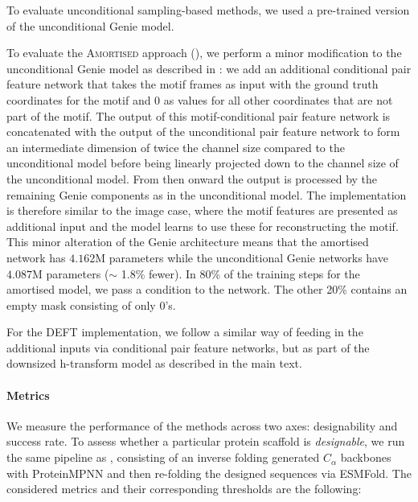 To evaluate unconditional sampling-based methods, we used a pre-trained version of the unconditional Genie model.

To evaluate the {\scshape Amortised} approach (), we perform a minor modification to the unconditional Genie model as described in \cite{didi2023framework}: we add an additional conditional pair feature network that takes the motif frames as input with the ground truth coordinates for the motif and 0 as values for all other coordinates that are not part of the motif. The output of this motif-conditional pair feature network is concatenated with the output of the unconditional pair feature network to form an intermediate dimension of twice the channel size compared to the unconditional model before being linearly projected down to the channel size of the unconditional model. From then onward the output is processed by the remaining Genie components as in the unconditional model. The implementation is therefore similar to the image case, where the motif features are presented as additional input and the model learns to use these for reconstructing the motif.
This minor alteration of the Genie architecture means that the amortised network has $4.162$M parameters while the unconditional Genie networks have $4.087$M parameters ($\sim$ 1.8\% fewer). In 80\% of the training steps for the amortised model, we pass a condition to the network. The other 20\% contains an empty mask consisting of only 0's.

For the DEFT implementation, we follow a similar way of feeding in the additional inputs via conditional pair feature networks, but as part of the downsized h-transform model as described in the main text.



\paragraph{Metrics}
We measure the performance of the methods across two axes: designability and success rate. 
To assess whether a particular protein scaffold is \emph{designable}, we run the same pipeline as \textcite{lin2023generating}, consisting of an inverse folding generated $C_\alpha$ backbones with ProteinMPNN and then re-folding the designed sequences via ESMFold. The considered metrics and their corresponding thresholds are the following:

